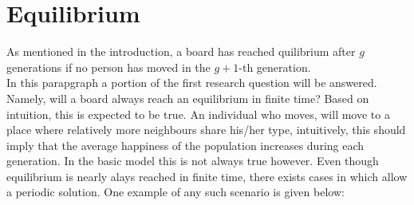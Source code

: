 
\section{Equilibrium}
 As mentioned in the introduction, a board has reached quilibrium after $g$ generations if no  person has moved in the $g+1$-th generation.\\
In this parapgraph a portion of the first research question will be answered. Namely, will a board always reach an equilibrium in finite time? Based on intuition, this is expected to be true. An individual who moves, will move to a place where relatively more neighbours share his/her type, intuitively, this should imply that the average happiness of the population increases during each generation. In the basic model this is not always true however. Even though equilibrium is nearly alays reached in finite time, there exists cases in which allow a periodic solution. One example of any such scenario is given below:\\

